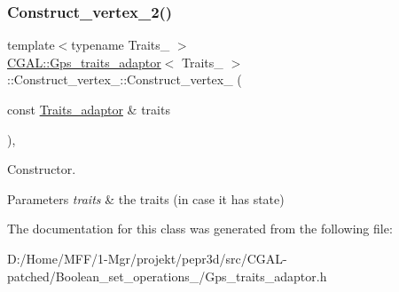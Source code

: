 \subsubsection{\texorpdfstring{Construct\_vertex\_2()}{Construct\_vertex\_2()}}
{\footnotesize\ttfamily template$<$typename Traits\+\_\+ $>$ \\
\mbox{\hyperlink{class_c_g_a_l_1_1_gps__traits__adaptor}{C\+G\+A\+L\+::\+Gps\+\_\+traits\+\_\+adaptor}}$<$ Traits\+\_\+ $>$\+::Construct\+\_\+vertex\+\_\+::\+Construct\+\_\+vertex\+\_ (\begin{DoxyParamCaption}\item[{const \mbox{\hyperlink{class_c_g_a_l_1_1_gps__traits__adaptor}{Traits\+\_\+adaptor}} \&}]{traits }\end{DoxyParamCaption})\hspace{0.3cm}{\ttfamily [inline]}, {\ttfamily [protected]}}



Constructor. 


\begin{DoxyParams}{Parameters}
{\em traits} & the traits (in case it has state) \\
\hline
\end{DoxyParams}


The documentation for this class was generated from the following file\+:\begin{DoxyCompactItemize}
\item 
D\+:/\+Home/\+M\+F\+F/1-\/\+Mgr/projekt/pepr3d/src/\+C\+G\+A\+L-\/patched/\+Boolean\+\_\+set\+\_\+operations\+\_/Gps\+\_\+traits\+\_\+adaptor.\+h\end{DoxyCompactItemize}
